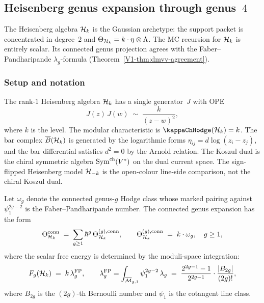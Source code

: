 %
%

\subsection{Heisenberg genus expansion through genus~$4$}

The Heisenberg algebra $\mathcal{H}_k$ is the Gaussian archetype:
the support packet is concentrated in degree~$2$ and
$\Theta_{\mathcal{H}_k} = k \cdot \eta \otimes \Lambda$. The MC
recursion for $\mathcal{H}_k$ is entirely scalar. Its connected genus
projection agrees with the Faber--Pandharipande $\lambda_g$-formula
(Theorem~\ref{V1-thm:dmvv-agreement}).

\subsubsection{Setup and notation}

The rank-$1$ Heisenberg algebra $\mathcal{H}_k$ has a single generator~$J$
with OPE
\begin{equation}%
J(z)\,J(w) \;\sim\; \frac{k}{(z-w)^2},
\end{equation}
where $k$ is the level. The modular characteristic is
$\kappaChHodge(\cH_k) = k$. The bar complex $\overline{B}(\mathcal{H}_k)$ is
generated by the logarithmic forms
$\eta_{ij} = d\log(z_i - z_j)$, and the bar differential satisfies
$d^2 = 0$ by the Arnold relation. The Koszul dual is the
chiral symmetric algebra $\operatorname{Sym}^{\mathrm{ch}}(V^*)$ on the dual
current space. The sign-flipped Heisenberg model $\mathcal{H}_{-k}$ is the
open-colour line-side comparison, not the chiral Koszul dual.

Let $\omega_g$ denote the connected genus-$g$ Hodge class whose marked
pairing against $\psi_1^{2g-2}$ is the Faber--Pandharipande number.
The connected genus expansion has the form
\begin{equation}%
\Theta_{\cH_k}^{\mathrm{conn}}
\;=\;
\sum_{g \geq 1} \hbar^g\,\Theta^{(g),\mathrm{conn}}_{\cH_k},
\qquad
\Theta^{(g),\mathrm{conn}}_{\cH_k}
\;=\;
k\cdot\omega_g,\quad g\ge1,
\end{equation}
where the scalar free energy is determined by the moduli-space
integration:
\begin{equation}%
F_g(\cH_k)
\;=\;
k\,\lambda_g^{\mathrm{FP}},
\qquad
\lambda_g^{\mathrm{FP}}
=
\int_{\overline{\cM}_{g,1}} \psi_1^{2g-2}\,\lambda_g
\;=\;
\frac{2^{2g-1} - 1}{2^{2g-1}}
\cdot
\frac{|B_{2g}|}{(2g)!},
\end{equation}
where $B_{2g}$ is the $(2g)$-th Bernoulli number and
$\psi_1$ is the cotangent line class.

